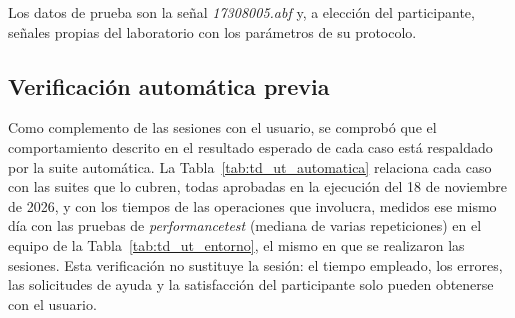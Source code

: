 \documentclass[12pt,letterpaper,oneside]{article}
\DeclareRobustCommand{\_}{\textunderscore\allowbreak}
\begin{document}
Los datos de prueba son la señal \textit{17308005.abf} y, a elección del participante, señales propias del laboratorio con los parámetros de su protocolo.

\subsection{Verificación automática previa}
\label{sec:td_ut_automatica}
Como complemento de las sesiones con el usuario, se comprobó que el comportamiento descrito en el resultado esperado de cada caso está respaldado por la suite automática. La Tabla~\ref{tab:td_ut_automatica} relaciona cada caso con las suites que lo cubren, todas aprobadas en la ejecución del 18 de noviembre de 2026, y con los tiempos de las operaciones que involucra, medidos ese mismo día con las pruebas de \textit{performance\_test} (mediana de varias repeticiones) en el equipo de la Tabla~\ref{tab:td_ut_entorno}, el mismo en que se realizaron las sesiones. Esta verificación no sustituye la sesión: el tiempo empleado, los errores, las solicitudes de ayuda y la satisfacción del participante solo pueden obtenerse con el usuario.
\end{document}
